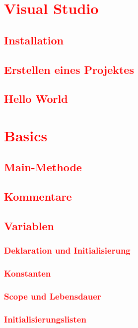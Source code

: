 \chapter{\textcolor{red}{Visual Studio}}\label{chap:visual-studio}
\section{\textcolor{red}{Installation}}\label{sec:installation}
\section{\textcolor{red}{Erstellen eines Projektes}}\label{sec:create-project}
\section{\textcolor{red}{Hello World}}\label{sec:hello-world}

\chapter{\textcolor{red}{Basics}}\label{chap:basics}
\section{\textcolor{red}{Main-Methode}}\label{sec:main-method}
\section{\textcolor{red}{Kommentare}}\label{sec:comments}
\section{\textcolor{red}{Variablen}}\label{sec:variables}
\subsection{\textcolor{red}{Deklaration und Initialisierung}}\label{sec:declaration-initialization}
\subsection{\textcolor{red}{Konstanten}}\label{sec:constants}
\subsection{\textcolor{red}{Scope und Lebensdauer}}\label{sec:scope-lifetime}
\subsection{\textcolor{red}{Initialisierungslisten}}\label{sec:initializer-lists}

